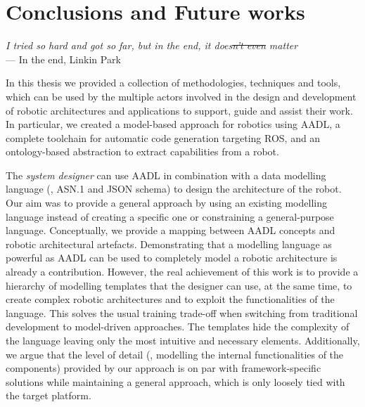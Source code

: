 \chapter[Conclusions and Future works]{Conclusions and Future works}\label{ch:Conclusions}

\begin{flushright}{\slshape I tried so hard and got so far, but in the end, it does\st{n't even} matter} \\ \medskip
    ---  In the end, Linkin Park
\end{flushright}


In this thesis we provided a collection of methodologies, techniques and tools, which can be used by the multiple actors involved in the design and development of robotic architectures and applications to support, guide and assist their work. In particular, we created a model-based approach for robotics using AADL, a complete toolchain for automatic code generation targeting ROS, and an ontology-based abstraction  to extract capabilities from a robot.

The \textit{system designer} can use AADL in combination with a data modelling language (\ie, ASN.1 and JSON schema) to design the architecture of the robot. Our aim was to provide a general approach by using an existing modelling language instead of creating a specific one or constraining a general-purpose language. Conceptually, we provide a mapping between AADL concepts and robotic architectural artefacts. Demonstrating that a modelling language as powerful as AADL can be used to completely model a robotic architecture is already a contribution. However, the real achievement of this work is to provide a hierarchy of modelling templates that the designer can use, at the same time, to create complex robotic architectures and to exploit the functionalities of the language. This solves the usual training trade-off when switching from traditional development to model-driven approaches. The templates hide the complexity of the language leaving only the most intuitive and necessary elements. Additionally, we argue that the level of detail (\ie, modelling the internal functionalities of the components) provided by our approach is on par with framework-specific solutions while maintaining a general approach, which is only loosely tied with the target platform.

